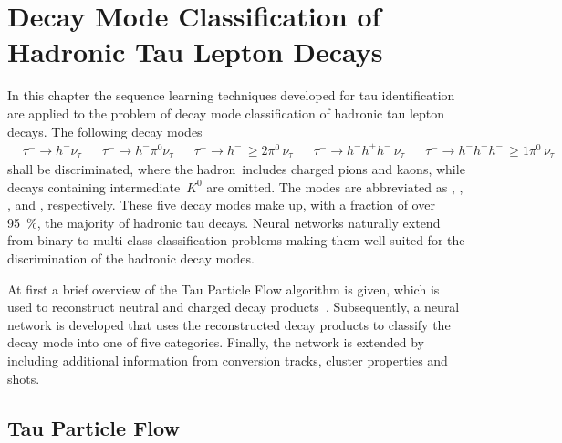 \chapter{Decay Mode Classification of Hadronic Tau Lepton Decays}
\label{sec:decaymode}

In this chapter the sequence learning techniques developed for tau
identification are applied to the problem of decay mode classification of
hadronic tau lepton decays. The following decay modes
\begin{align*}
  &\tau^- \to h^- \nu_\tau  & &\tau^- \to h^- \pi^0 \nu_\tau & &\tau^- \to h^- \, {\geq} 2\pi^0 \, \nu_\tau & &\tau^- \to h^- h^+ h^- \, \nu_\tau & &\tau^- \to h^- h^+ h^-\, {\geq} 1 \pi^0 \, \nu_\tau
\end{align*}
shall be discriminated, where the hadron~\hpm includes charged pions and kaons,
while decays containing intermediate~$K^0$ are omitted. The modes are
abbreviated as \hpm, \hpmpi, \hpmpipi, \hhhpm and \hhhpmpi, respectively.
These five decay modes make up, with a fraction of over
\SI{95}{\percent}, the majority of hadronic tau decays.
Neural networks naturally extend from binary to multi-class classification
problems making them well-suited for the discrimination of the hadronic decay
modes.

At first a brief overview of the Tau Particle Flow algorithm is given, which is
used to reconstruct neutral and charged decay products~\cite{bwinter,
  atlas:taurec:decaymodes}. Subsequently, a neural network is developed that
uses the reconstructed decay products to classify the decay mode into one of
five categories. Finally, the network is extended by including additional
information from conversion tracks, cluster properties and shots.

\section{Tau Particle Flow}
\label{sec:tau_pflow}

